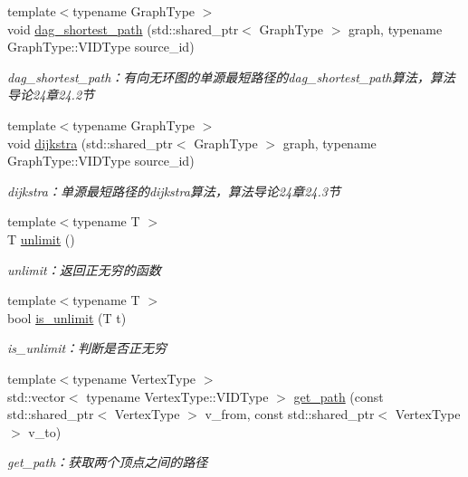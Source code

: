 \begin{DoxyCompactItemize}
{\footnotesize template$<$typename Graph\+Type $>$ }\\void \hyperlink{namespace_introduction_to_algorithm_1_1_graph_algorithm_aec7fe196e6aee4c8e6004a05495c8813}{dag\+\_\+shortest\+\_\+path} (std\+::shared\+\_\+ptr$<$ Graph\+Type $>$ graph, typename Graph\+Type\+::\+V\+I\+D\+Type source\+\_\+id)
\begin{DoxyCompactList}\small\item\em dag\+\_\+shortest\+\_\+path：有向无环图的单源最短路径的dag\+\_\+shortest\+\_\+path算法，算法导论24章24.2节 \end{DoxyCompactList}\item 
{\footnotesize template$<$typename Graph\+Type $>$ }\\void \hyperlink{namespace_introduction_to_algorithm_1_1_graph_algorithm_acac554e111d6377c630865258dd6aa19}{dijkstra} (std\+::shared\+\_\+ptr$<$ Graph\+Type $>$ graph, typename Graph\+Type\+::\+V\+I\+D\+Type source\+\_\+id)
\begin{DoxyCompactList}\small\item\em dijkstra：单源最短路径的dijkstra算法，算法导论24章24.3节 \end{DoxyCompactList}\item 
{\footnotesize template$<$typename T $>$ }\\T \hyperlink{namespace_introduction_to_algorithm_1_1_graph_algorithm_a19237111c3b1ec2717c5e1aefe2f6d9b}{unlimit} ()
\begin{DoxyCompactList}\small\item\em unlimit：返回正无穷的函数 \end{DoxyCompactList}\item 
{\footnotesize template$<$typename T $>$ }\\bool \hyperlink{namespace_introduction_to_algorithm_1_1_graph_algorithm_a4f664c13605fc87ca8d26f4aad5a9fa2}{is\+\_\+unlimit} (T t)
\begin{DoxyCompactList}\small\item\em is\+\_\+unlimit：判断是否正无穷 \end{DoxyCompactList}\item 
{\footnotesize template$<$typename Vertex\+Type $>$ }\\std\+::vector$<$ typename Vertex\+Type\+::\+V\+I\+D\+Type $>$ \hyperlink{namespace_introduction_to_algorithm_1_1_graph_algorithm_a1581960f77507024b39572aeb6d1fbd6}{get\+\_\+path} (const std\+::shared\+\_\+ptr$<$ Vertex\+Type $>$ v\+\_\+from, const std\+::shared\+\_\+ptr$<$ Vertex\+Type $>$ v\+\_\+to)
\begin{DoxyCompactList}\small\item\em get\+\_\+path：获取两个顶点之间的路径 \end{DoxyCompactList}\item 

\end{DoxyCompactItemize}
